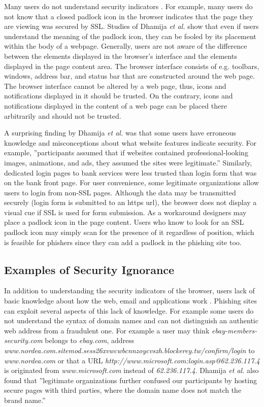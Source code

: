 \documentclass{tktltiki}
\begin{document}
    Many users do not understand security indicators \cite{why_phishing_works_06}. For example, many users do not know that a closed padlock icon in the browser indicates that the page they are viewing was secured by SSL. Studies of Dhamija \emph{et al.} \cite{why_phishing_works_06} show that even if users understand the meaning of the padlock icon, they can be fooled by its placement within the body of a webpage. Generally, users are not aware of the difference between the elements displayed in the browser's interface and the elements displayed in the page content area. The browser interface consists of e.g. toolbars, windows, address bar, and status bar that are constructed around the web page. The browser interface cannot be altered by a web page, thus, icons and notifications displayed in it should be trusted. On the contrary, icons and notifications displayed in the content of a web page can be placed there arbitrarily and should not be trusted.
        
        A surprising finding by Dhamija \emph{et al.} \cite{why_phishing_works_06}was that some users have erroneous knowledge and misconceptions about what website features indicate security. For example, ''participants assumed that if websites contained professional-looking images, animations, and ads, they assumed the sites were legitimate.'' Similarly, dedicated login pages to bank services were less trusted than login form that was on the bank front page. For user convenience, some legitimate organizations allow users to login from non-SSL pages. Although the data may be transmitted securely (login form is submitted to an https url), the browser does not display a visual cue if SSL is used for form submission. As a workaround designers may place a padlock icon in the page content. Users who know to look for an SSL padlock icon may simply scan for the presence of it regardless of position, which is feasible for phishers since they can add a padlock in the phishing site too.
        
    
\subsection{Examples of Security Ignorance}

    In addition to understanding the security indicators of the browser, users lack of basic knowledge about how the web, email and applications work \cite{why_phishing_works_06}. Phishing sites can exploit several aspects of this lack of knowledge. For example some users do not understand the syntax of domain names and can not distinguish an authentic web address from a fraudulent one. For example a user may think 
\emph{ebay-members-security.com} belongs to \emph{ebay.com}, address \\
\emph{www.nordea.com.sitemod.sess26xvwcwbcnnzoycvszh.blockerey.tw/confirm/login}
to \emph{www.nordea.com} or that a URL \emph{http://www.microsoft.com:login.asp@62.236.117.4}
is originated from \emph{www.microsoft.com} instead of \emph{62.236.117.4}. 
Dhamija \emph{et al.} \cite{why_phishing_works_06} also found that ''legitimate organizations further confused our participants by hosting secure pages with third parties, where the domain name does not match the brand name.''
        
\end{document}
